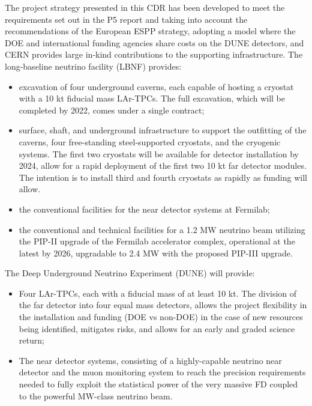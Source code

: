 The project strategy presented in this CDR has been developed to meet the requirements 
set out in the P5 report and taking into account the recommendations of the European 
ESPP strategy, adopting a model where the DOE and international funding agencies 
share costs on the DUNE detectors, and CERN provides large in-kind contributions 
to the supporting infrastructure.
The long-baseline neutrino facility (LBNF) provides:
\begin{itemize}
\item excavation of four underground caverns, each capable of hosting a cryostat 
with a 10 kt fiducial mass LAr-TPCs. The full excavation, which will be completed 
by 2022, comes under a single contract;

\item surface, shaft, and underground infrastructure to support 
the outfitting of the caverns, four free-standing steel-supported cryostats, 
and the cryogenic systems. The first two cryostats will be available for detector
installation by 2024, allow for a rapid deployment of the first two 10 kt far detector modules. 
The intention is to install third and fourth cryostats as rapidly as funding will 
allow.

\item  the conventional facilities for the near detector systems at Fermilab; 

\item  the conventional and technical facilities for a 1.2 MW neutrino beam utilizing the PIP-II upgrade of the Fermilab accelerator 
complex, operational at the latest by 2026, upgradable to 2.4 MW with the proposed 
PIP-III upgrade.
\end{itemize}

The Deep Underground Neutrino Experiment (DUNE) will provide:

\begin{itemize}
\item Four LAr-TPCs, each with a fiducial mass of at least 10 kt. The division of 
the far detector into four equal mass detectors, allows the project flexibility 
in the installation and funding (DOE vs non-DOE) in the case of new resources being 
identified, mitigates risks, and allows for an early and graded science return;

\item The near detector systems, consisting of a highly-capable neutrino near detector 
and the muon monitoring system to reach the precision requirements needed to fully 
exploit the statistical power of the very massive FD coupled to the powerful MW-class 
neutrino beam.

\end{itemize}

